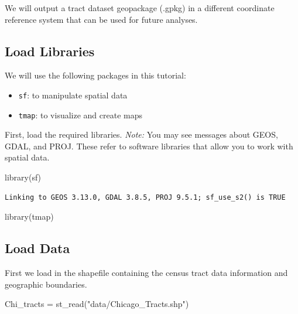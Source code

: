 \documentclass[
  letterpaper,
  DIV=11,
  numbers=noendperiod]{scrreprt}
\newenvironment{Shaded}{\begin{snugshade}}{\end{snugshade}}
\newcommand{\FunctionTok}[1]{\textcolor[rgb]{0.28,0.35,0.67}{#1}}
\newcommand{\NormalTok}[1]{\textcolor[rgb]{0.00,0.23,0.31}{#1}}
\newcommand{\OtherTok}[1]{\textcolor[rgb]{0.00,0.23,0.31}{#1}}
\newcommand{\StringTok}[1]{\textcolor[rgb]{0.13,0.47,0.30}{#1}}
\providecommand{\tightlist}{%
  \setlength{\itemsep}{0pt}\setlength{\parskip}{0pt}}
\begin{document}
We will output a tract dataset geopackage (.gpkg) in a different
coordinate reference system that can be used for future analyses.

\subsection{Load Libraries}\label{load-libraries}

We will use the following packages in this tutorial:

\begin{itemize}
\tightlist
\item
  \texttt{sf}: to manipulate spatial data
\item
  \texttt{tmap}: to visualize and create maps
\end{itemize}

First, load the required libraries. \emph{Note:} You may see messages
about GEOS, GDAL, and PROJ. These refer to software libraries that allow
you to work with spatial data.

\begin{Shaded}
\begin{Highlighting}[]
\FunctionTok{library}\NormalTok{(sf)}
\end{Highlighting}
\end{Shaded}

\begin{verbatim}
Linking to GEOS 3.13.0, GDAL 3.8.5, PROJ 9.5.1; sf_use_s2() is TRUE
\end{verbatim}

\begin{Shaded}
\begin{Highlighting}[]
\FunctionTok{library}\NormalTok{(tmap)}
\end{Highlighting}
\end{Shaded}

\subsection{Load Data}\label{load-data}

First we load in the shapefile containing the census tract data
information and geographic boundaries.

\begin{Shaded}
\begin{Highlighting}[]
\NormalTok{Chi\_tracts }\OtherTok{=} \FunctionTok{st\_read}\NormalTok{(}\StringTok{"data/Chicago\_Tracts.shp"}\NormalTok{)}
\end{Highlighting}
\end{Shaded}
\end{document}
